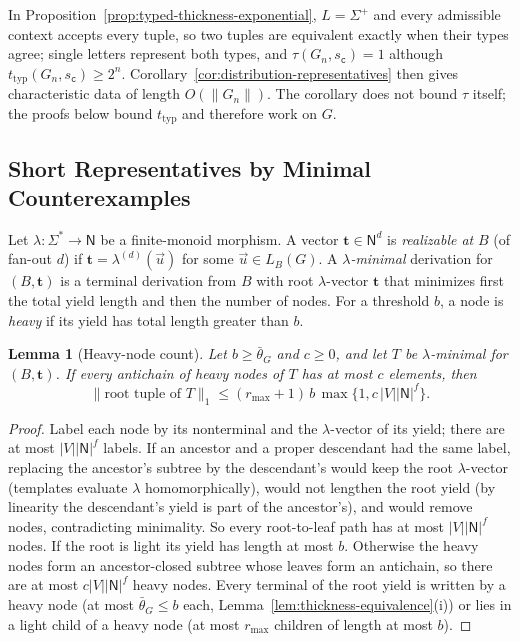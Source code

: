 \documentclass[11pt]{article}
\numberwithin{equation}{section}
\theoremstyle{plain}
\newtheorem{lemma}[theorem]{Lemma}
\theoremstyle{definition}
\theoremstyle{remark}
\newcommand{\tuple}[1]{\vec{#1}}
\begin{document}
In Proposition~\ref{prop:typed-thickness-exponential}, $L=\Sigma^+$ and every
admissible context accepts every tuple, so two tuples are equivalent exactly
when their types agree; single letters represent both types, and
$\tau(G_n,s_{\mathtt c})=1$ although $t_{\mathrm{typ}}(G_n,s_{\mathtt c})\ge2^n$.
Corollary~\ref{cor:distribution-representatives} then gives characteristic
data of length $O(\|G_n\|)$.  The corollary does not bound $\tau$ itself; the
proofs below bound $t_{\mathrm{typ}}$ and therefore work on $G$.

\subsection{Short Representatives by Minimal Counterexamples}
\label{subsec:group-invariants}

Let $\lambda:\Sigma^*\to\mathsf N$ be a finite-monoid morphism.  A vector
$\mathbf t\in\mathsf N^d$ is \emph{realizable at} $B$ (of fan-out $d$) if
$\mathbf t=\lambda^{(d)}(\tuple u)$ for some $\tuple u\in L_B(G)$.  A
\emph{$\lambda$-minimal} derivation for $(B,\mathbf t)$ is a terminal derivation
from $B$ with root $\lambda$-vector $\mathbf t$ that minimizes first the total
yield length and then the number of nodes.  For a threshold $b$, a node is
\emph{heavy} if its yield has total length greater than $b$.

\begin{lemma}[Heavy-node count]
\label{lem:heavy-node-count}
Let $b\ge\bar\theta_G$ and $c\ge0$, and let $T$ be $\lambda$-minimal for
$(B,\mathbf t)$.  If every antichain of heavy nodes of $T$ has at most $c$
elements, then
\[
 \|\text{root tuple of }T\|_1\le(r_{\max}+1)\,b\,\max\{1,c\,|V||\mathsf N|^f\}.
\]
\end{lemma}

\begin{proof}
Label each node by its nonterminal and the $\lambda$-vector of its yield; there
are at most $|V||\mathsf N|^f$ labels.  If an ancestor and a proper descendant had the same
label, replacing the ancestor's subtree by the descendant's would keep the root
$\lambda$-vector (templates evaluate $\lambda$ homomorphically), would not
lengthen the root yield (by linearity the descendant's yield is part of the
ancestor's), and would remove nodes, contradicting minimality.  So every
root-to-leaf path has at most $|V||\mathsf N|^f$ nodes.  If the root is light its yield has
length at most $b$.  Otherwise the heavy nodes form an ancestor-closed subtree
whose leaves form an antichain, so there are at most $c|V||\mathsf N|^f$ heavy nodes.
Every terminal of the root yield is written by a heavy node (at most
$\bar\theta_G\le b$ each, Lemma~\ref{lem:thickness-equivalence}(i)) or lies in a
light child of a heavy node (at most $r_{\max}$ children of length at most $b$).
\end{proof}
\end{document}
